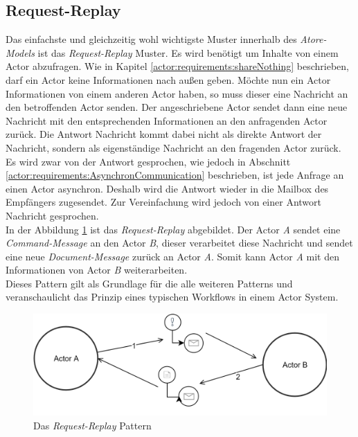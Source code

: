 \subsection{Request-Replay} 
Das einfachste und gleichzeitig wohl wichtigste Muster innerhalb des \textit{Atore-Models} ist das \textit{Request-Replay} Muster. Es wird benötigt um Inhalte von einem Actor abzufragen. Wie in Kapitel \ref{actor:requirements:shareNothing} beschrieben, darf ein Actor keine Informationen nach außen geben. Möchte nun ein Actor Informationen von einem anderen Actor haben, so muss dieser eine Nachricht an den betroffenden Actor senden. Der angeschriebene Actor sendet dann eine neue Nachricht mit den entsprechenden Informationen an den anfragenden Actor zurück. Die Antwort Nachricht kommt dabei nicht als direkte Antwort der Nachricht, sondern als eigenständige Nachricht an den fragenden Actor zurück. Es wird zwar von der Antwort gesprochen, wie jedoch in Abschnitt \ref{actor:requirements:AsynchronCommunication} beschrieben, ist jede Anfrage an einen Actor asynchron. Deshalb wird die Antwort wieder in die Mailbox des Empfängers zugesendet. Zur Vereinfachung wird jedoch von einer Antwort Nachricht gesprochen. \\
% 
% 
% 
% 
% 
In der Abbildung \ref{fig:actor:patterns:requestReplay} ist das \textit{Request-Replay} abgebildet. Der Actor \textit{A} sendet eine \textit{Command-Message} an den Actor \textit{B}, dieser verarbeitet diese Nachricht und sendet eine neue \textit{Document-Message} zurück an Actor \textit{A}. Somit kann Actor \textit{A} mit den Informationen von Actor \textit{B} weiterarbeiten.  \\
Dieses Pattern gilt als Grundlage für die alle weiteren Patterns und veranschaulicht das Prinzip eines typischen Workflows in einem Actor System. \citep{Vernon2015ReactiveAkka}
\begin{figure}
    \centering
    \includegraphics[width=\linewidth]{gfx/actor/patterns/requestReplay}
    \caption{Das \textit{Request-Replay} Pattern}
    \label{fig:actor:patterns:requestReplay}
\end{figure}

